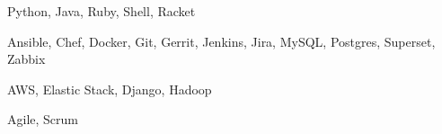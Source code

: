 \documentclass{newresume}
\begin{document}
\smallskip


\begin{body}
\begin{description}[style=nextline,leftmargin=8em,topsep=1pt]
	\item[Languages] Python, Java, Ruby, Shell, Racket
	\item[Tools] Ansible, Chef, Docker, Git, Gerrit, Jenkins, Jira, MySQL, Postgres, Superset, Zabbix
	\item[Frameworks] AWS, Elastic Stack, Django, Hadoop
	\item[Methodologies] Agile, Scrum
\end{description}
\end{body}






%




\end{document}
